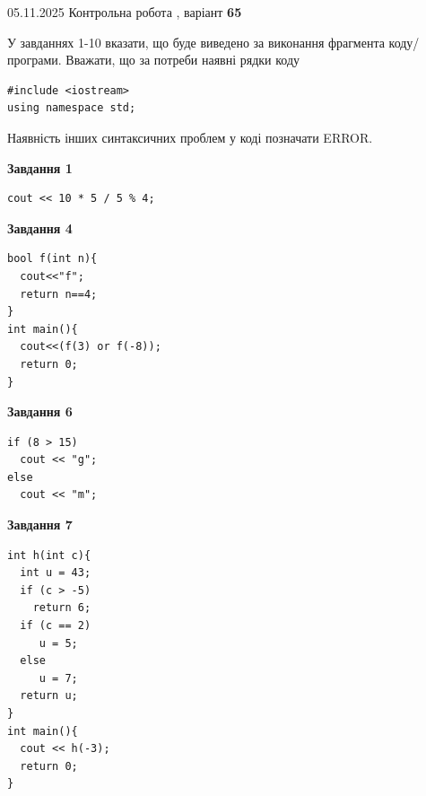 \documentclass[12pt, ukrainian]{article}
\begin{document}
{\Large{05.11.2025 Контрольна робота , варіант  \No \textbf { 65 }\par}}
{
\begin {large}
У завданнях 1-10 вказати, що буде виведено за виконання фрагмента коду/про\-гра\-ми.
Вважати, що за потреби наявні рядки коду
\begin{verbatim}
#include <iostream>
using namespace std;
\end{verbatim}
Наявність інших синтаксичних проблем у коді позначати ERROR.

\begin{minipage}[t]{7.0cm}

\begin{center}
\textbf{Завдання 1}
\end{center}
\vspace{-8mm}

\begin{verbatim}
cout << 10 * 5 / 5 % 4;
\end{verbatim}



\begin{center}
\textbf{Завдання 4}
\end{center}
\vspace{-8mm}

\begin{verbatim}
bool f(int n){
  cout<<"f";
  return n==4;
}
int main(){
  cout<<(f(3) or f(-8));
  return 0;
}
\end{verbatim}



\begin{center}
\textbf{Завдання 6}
\end{center}
\vspace{-8mm}

\begin{verbatim}
if (8 > 15)
  cout << "g";
else
  cout << "m";
\end{verbatim}



\begin{center}
\textbf{Завдання 7}
\end{center}
\vspace{-8mm}

\begin{verbatim}
int h(int c){
  int u = 43;
  if (c > -5)
    return 6;
  if (c == 2)
     u = 5;
  else
     u = 7;
  return u;
}
int main(){
  cout << h(-3);
  return 0;
}
\end{verbatim}


\end{minipage}
\end{large}}
\end{document}
